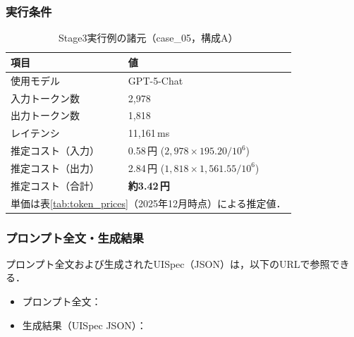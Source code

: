 \documentclass[a4paper,10pt]{jarticle}
\begin{document}
\subsubsection{実行条件}

\begin{table}[htbp]
\centering
\caption{Stage3実行例の諸元（case\_05，構成A）}
\label{tab:prompt_example_metrics}
\begin{tabular}{ll}
\toprule
項目 & 値 \\
\midrule
使用モデル & GPT-5-Chat \\
入力トークン数 & 2,978 \\
出力トークン数 & 1,818 \\
レイテンシ & 11,161\,ms \\
\midrule
推定コスト（入力） & 0.58\,円 \quad ($2{,}978 \times 195.20 / 10^6$) \\
推定コスト（出力） & 2.84\,円 \quad ($1{,}818 \times 1{,}561.55 / 10^6$) \\
推定コスト（合計） & \textbf{約3.42\,円} \\
\bottomrule
\multicolumn{2}{l}{\small 単価は表\ref{tab:token_prices}（2025年12月時点）による推定値．} \\
\end{tabular}
\end{table}

\subsubsection{プロンプト全文・生成結果}

プロンプト全文および生成されたUISpec（JSON）は，以下のURLで参照できる．

\begin{itemize}
  \item プロンプト全文：\\
  \item 生成結果（UISpec JSON）：\\
\end{itemize}


\newcommand{\DynUILevel}{Level} %
\newcommand{\LevelFour}{Level4} %
\newcommand{\LLMStep}{Step} %
\end{document}
